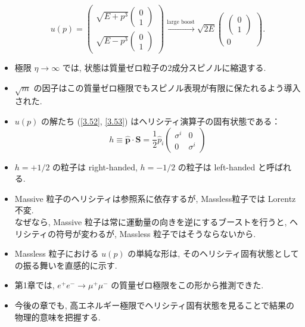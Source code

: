 \documentclass[a4paper,12pt]{article}
\begin{document}
\begin{itemize}
\begin{equation*}
    u(p) =
    \begin{pmatrix}
      \sqrt{E + p^3} \begin{pmatrix} 0 \\ 1 \end{pmatrix} \\
      \sqrt{E - p^3} \begin{pmatrix} 0 \\ 1 \end{pmatrix}
    \end{pmatrix} \label{3.53}\tag{3.53}
    \xrightarrow{\text{large boost}}
    \sqrt{2E}
    \begin{pmatrix}
      \begin{pmatrix} 0 \\ 1 \end{pmatrix} \\
      0
    \end{pmatrix}.
  \end{equation*}

  \item 極限 $\eta \to \infty$ では, 状態は質量ゼロ粒子の2成分スピノルに縮退する.
  \item $\sqrt{m}$ の因子はこの質量ゼロ極限でもスピノル表現が有限に保たれるよう導入された.
  \item $u(p)$ の解たち (\eqref{3.52}, \eqref{3.53}) はヘリシティ演算子の固有状態である：
  \begin{equation*}
    h \equiv \hat{\mathbf{p}} \cdot \mathbf{S}
    = \frac{1}{2} \hat{p}_i
    \begin{pmatrix}
      \sigma^i & 0 \\
      0 & \sigma^i
    \end{pmatrix} \tag{3.54}
  \end{equation*}

  \item $h = +1/2$ の粒子は right-handed, $h = -1/2$ の粒子は left-handed と呼ばれる.
  \item Massive 粒子のヘリシティは参照系に依存するが, Massless粒子では Lorentz 不変.\\
  なぜなら, Massive 粒子は常に運動量の向きを逆にするブーストを行うと, ヘリシティの符号が変わるが, Massless 粒子ではそうならないから.
  \item Massless 粒子における $u(p)$ の単純な形は, そのヘリシティ固有状態としての振る舞いを直感的に示す.
  \item 第1章では, $e^+ e^- \to \mu^+ \mu^-$ の質量ゼロ極限をこの形から推測できた.
  \item 今後の章でも, 高エネルギー極限でヘリシティ固有状態を見ることで結果の物理的意味を把握する.


\end{itemize}
\end{document}
